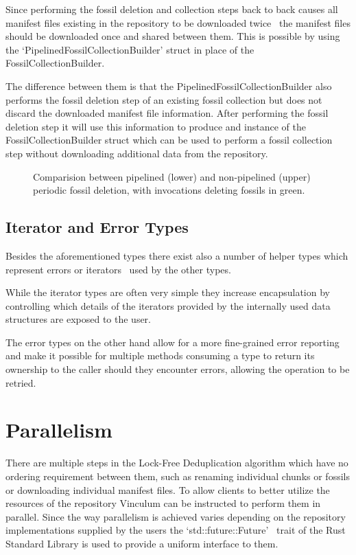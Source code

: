 Since performing the fossil deletion and collection steps back to back causes
all manifest files existing in the repository to be downloaded twice~\cite[Algorithm 1 and 2]{Duplicacy}
the manifest files should be downloaded once and shared between them.
This is possible by using the `PipelinedFossilCollectionBuilder' struct in place
of the FossilCollectionBuilder.

The difference between them is that the PipelinedFossilCollectionBuilder also
performs the fossil deletion step of an existing fossil collection but does not
discard the downloaded manifest file information.
After performing the fossil deletion step it will use this information to produce
and instance of the FossilCollectionBuilder struct which can be used to perform
a fossil collection step without downloading additional data from the repository.

\begin{figure}
    
    \caption{Comparision between pipelined (lower) and non-pipelined (upper) periodic fossil deletion, with invocations deleting fossils in green.}\label{fig:pipelining}
\end{figure}

\subsection{Iterator and Error Types}

Besides the aforementioned types there exist also a number of helper types
which represent errors or iterators~\cite{GoF} used by the other types.

While the iterator types are often very simple they increase encapsulation by
controlling which details of the iterators provided by the internally used data
structures are exposed to the user.

The error types on the other hand allow for a more fine-grained error reporting
and make it possible for multiple methods consuming a type to return its ownership
to the caller should they encounter errors, allowing the operation to be retried.

\section{Parallelism}\label{sec:parallelism}

There are multiple steps in the Lock-Free Deduplication algorithm which have no
ordering requirement between them, such as renaming individual chunks or fossils
or downloading individual manifest files.
To allow clients to better utilize the resources of the repository Vinculum
can be instructed to perform them in parallel.
Since the way parallelism is achieved varies depending on the repository implementations
supplied by the users the `std::future::Future'~\cite{Rust-Docs} trait of the Rust
Standard Library is used to provide a uniform interface to them.

